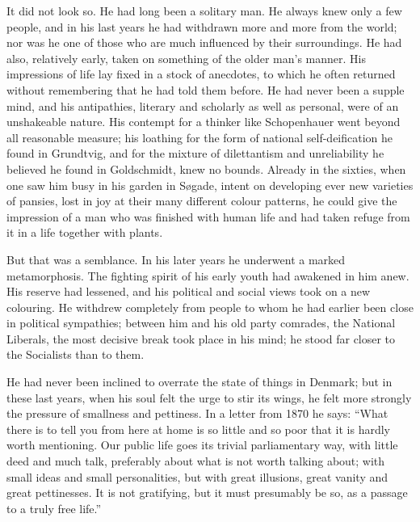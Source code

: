 \documentclass[12pt,a4paper,openany]{book}
\newcommand{\opage}[1]{\marginnote{\footnotesize\textit{[#1]}}}
\begin{document}
It did not look so. He had long been a solitary man. He always knew only a
few people, and in his last years he had
\opage{247}withdrawn more and more from the world; nor was he one of those who are much
influenced by their surroundings. He had also, relatively early, taken on
something of the older man's manner. His impressions of life lay fixed in a
stock of anecdotes, to which he often returned without remembering that he had
told them before. He had never been a supple mind, and his antipathies,
literary and scholarly as well as personal, were of an unshakeable nature. His
contempt for a thinker like Schopenhauer went beyond all reasonable measure;
his loathing for the form of national self-deification he found in Grundtvig,
and for the mixture of dilettantism and unreliability he believed he found in
Goldschmidt, knew no bounds. Already in the sixties, when one saw him busy in
his garden in Søgade, intent on developing ever new varieties of pansies, lost
in joy at their many different colour patterns, he could give the impression
of a man who was finished with human life and had taken refuge from it in a
life together with plants.

But that was a semblance. In his later years he underwent a marked
metamorphosis. The fighting spirit of his early youth had awakened in him
anew. His reserve had lessened, and his political and social views
\opage{248}took on a new colouring. He withdrew completely from people to whom he had
earlier been close in political sympathies; between him and his old party
comrades, the National Liberals, the most decisive break took place in his
mind; he stood far closer to the Socialists than to them.

He had never been inclined to overrate the state of things in Denmark; but in
these last years, when his soul felt the urge to stir its wings, he felt more
strongly the pressure of smallness and pettiness. In a letter from 1870 he
says: ``What there is to tell you from here at home is so little and so poor
that it is hardly worth mentioning. Our public life goes its trivial
parliamentary way, with little deed and much talk, preferably about what is
not worth talking about; with small ideas and small personalities, but with
great illusions, great vanity and great pettinesses. It is not gratifying, but
it must presumably be so, as a passage to a truly free life.''
\end{document}
